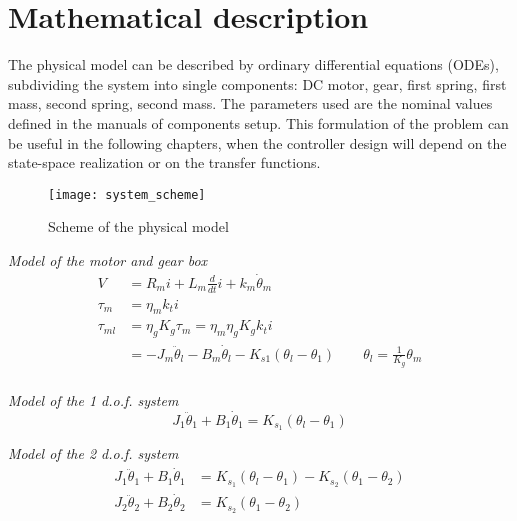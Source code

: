 \section{Mathematical description}

The physical model can be described by ordinary differential equations (ODEs), subdividing the system into single components: DC motor, gear, first spring, first mass, second spring, second mass. The parameters used are the nominal values defined in the manuals of components setup. This formulation of the problem can be useful in the following chapters, when the controller design will depend on the state-space realization or on the transfer functions.
\begin{figure*}[h]
	\centering
	\texttt{[image: system\_scheme]}
	\caption{Scheme of the physical model}
\end{figure*}

\textit{Model of the motor and gear box}
\begin{subequations}
	\begin{align}
		V &= R_m i + L_m \frac{d}{dt}i + k_m \dot{\theta}_m \\
		\tau_m &= \eta_m k_t i \\
		\tau_{ml} &= \eta_g K_g \tau_m = \eta_m \eta_g K_g k_t i\\
		&= -J_m \ddot{\theta}_l - B_m \dot{\theta}_l - K_{s1} ( \theta_l - \theta_1 ) \qquad  \theta_l = \frac {1}{K_g} \theta_m \\
		\label{fig:model_equations}
	\end{align}
\end{subequations}

\textit{Model of the 1 d.o.f. system}
\begin{equation}
	J_1 \ddot{\theta}_1 + B_1 \dot{\theta}_1 = K_{s_1} ( \theta_l - \theta_1 )
\end{equation}

\textit{Model of the 2 d.o.f. system}
\begin{subequations}
	\begin{align}
		J_1 \ddot{\theta}_1 + B_1 \dot{\theta}_1 &= K_{s_1} ( \theta_l - \theta_1 ) - K_{s_2} ( \theta_1 - \theta_2 ) \\
		J_2 \ddot{\theta}_2 + B_2 \dot{\theta}_2 &= K_{s_2} ( \theta_1 - \theta_2 )
	\end{align}
\end{subequations}

